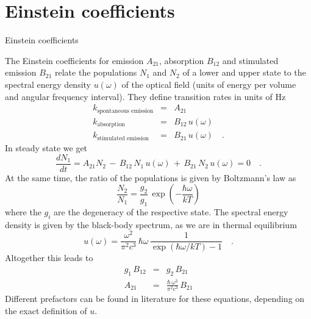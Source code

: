 \section{Einstein coefficients}

\begin{marginfigure}

  \caption{Einstein coefficients}
\end{marginfigure}


The Einstein coefficients for emission $A_{21}$, absorption $B_{12}$ and stimulated emission $B_{21}$ relate the populations $N_1$ and $N_2$ of a lower and upper state to the spectral energy density $u(\omega)$ of the optical field (units of energy per volume and angular frequency interval). They define transition rates in units of Hz
\begin{eqnarray}
 k_{\text{spontaneous emission}} &=& A_{21} \\
  k_{\text{absorption}}  & = & B_{12} \,   u(\omega) \\
  k_{\text{stimulated emission }} & =&  B_{21} \,  u(\omega)  \quad .
\end{eqnarray}
%
In steady state we get
\begin{equation}
 \frac{d N_1}{dt} =  A_{21} N_2 \, - \, B_{12} \, N_1 \, u(\omega) \, + \, B_{21}\, N_2 \,u(\omega)  = 0 \quad .
\end{equation}
At the same time, the ratio of the populations is given by Boltzmann's law as
\begin{equation}
 \frac{N_2}{N_1} = \frac{g_2}{g_1} \, \exp \left( - \frac{\hbar \omega}{kT} \right)
\end{equation}
where the $g_i$ are the degeneracy of the respective state. The spectral energy density is given by the black-body spectrum, as we are in thermal equilibrium
\begin{equation}
 u(\omega) = \frac{\omega^2}{\pi^2 c^3} \, \hbar \omega \, \frac{1}{\exp \left( \hbar \omega / kT \right) - 1} \quad .
\end{equation}
Altogether this leads to 
\begin{eqnarray}
 g_1 \, B_{12} &=& g_2 \, B_{21} \\
 A_{21} &=&  \frac{\hbar \, \omega^3}{\pi^2 c^3} \, B_{21}  \label{eq:fl_Einstein_A_B}
\end{eqnarray}
Different prefactors can be found in literature for these equations, depending on the exact definition of $u$.
